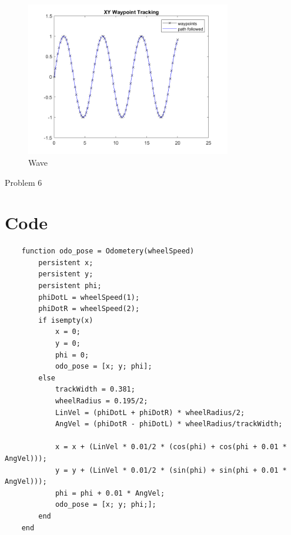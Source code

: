 \documentclass[answers]{exam}
\begin{document}
\begin{questions}
    \begin{figure}[H]
        \centering
        \includegraphics[width=0.8\textwidth]{images/5-wave.png}
        \caption{Wave}
        \label{fig:my_label}
    \end{figure}

    \question Problem 6
    \section*{Code}
    \begin{lstlisting}
    function odo_pose = Odometery(wheelSpeed)
        persistent x;
        persistent y;
        persistent phi;
        phiDotL = wheelSpeed(1);
        phiDotR = wheelSpeed(2);
        if isempty(x)
            x = 0;
            y = 0;
            phi = 0;
            odo_pose = [x; y; phi];
        else
            trackWidth = 0.381;
            wheelRadius = 0.195/2;
            LinVel = (phiDotL + phiDotR) * wheelRadius/2;
            AngVel = (phiDotR - phiDotL) * wheelRadius/trackWidth;
    
            x = x + (LinVel * 0.01/2 * (cos(phi) + cos(phi + 0.01 * AngVel)));
            y = y + (LinVel * 0.01/2 * (sin(phi) + sin(phi + 0.01 * AngVel)));
            phi = phi + 0.01 * AngVel;
            odo_pose = [x; y; phi;];
        end
    end
    \end{lstlisting}


\end{questions}
\end{document}
